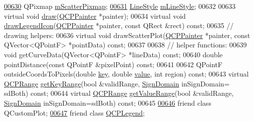 \begin{DoxyCode}
\hypertarget{a00116_source_l00630}{}\hyperlink{a00028_a04103a65b13b2218265e74c567a7061e}{00630}   QPixmap \hyperlink{a00028_a04103a65b13b2218265e74c567a7061e}{mScatterPixmap};
\hypertarget{a00116_source_l00631}{}\hyperlink{a00028_ae1f35ae2b15aee8e15bcdfec5be95156}{00631}   \hyperlink{a00028_a2710e9f79302152cff794c6e16cc01f1}{LineStyle} \hyperlink{a00028_ae1f35ae2b15aee8e15bcdfec5be95156}{mLineStyle};
00632   
00633   \textcolor{keyword}{virtual} \textcolor{keywordtype}{void} \hyperlink{a00024_aae10c24c7ed9d9364f0a5a4d9a5e5aec}{draw}(\hyperlink{a00047}{QCPPainter} *painter);
00634   \textcolor{keyword}{virtual} \textcolor{keywordtype}{void} \hyperlink{a00024_ab28af4bd3965813be4223d8092aed38b}{drawLegendIcon}(\hyperlink{a00047}{QCPPainter} *painter, \textcolor{keyword}{const} QRect &rect) \textcolor{keyword}{const};
00635   \textcolor{comment}{// drawing helpers:}
00636   \textcolor{keyword}{virtual} \textcolor{keywordtype}{void} drawScatterPlot(\hyperlink{a00047}{QCPPainter} *painter, \textcolor{keyword}{const} QVector<QPointF> *pointData) \textcolor{keyword}{const};
00637   
00638   \textcolor{comment}{// helper functions:}
00639   \textcolor{keywordtype}{void} getCurveData(QVector<QPointF> *lineData) \textcolor{keyword}{const};
00640   \textcolor{keywordtype}{double} pointDistance(\textcolor{keyword}{const} QPointF &pixelPoint) \textcolor{keyword}{const};
00641 
00642   QPointF outsideCoordsToPixels(\textcolor{keywordtype}{double} \hyperlink{a00116_a94bb892c30911cd62cba0707a5395be4}{key}, \textcolor{keywordtype}{double} \hyperlink{a00116_aee90379adb0307effb138f4871edbc5c}{value}, \textcolor{keywordtype}{int} region) \textcolor{keyword}{const};
00643   \textcolor{keyword}{virtual} \hyperlink{a00049}{QCPRange} \hyperlink{a00024_a7aa24ed0b3c39bd99338c7b9f145a71b}{getKeyRange}(\textcolor{keywordtype}{bool} &validRange, \hyperlink{a00024_a661743478a1d3c09d28ec2711d7653d8}{SignDomain} inSignDomain=
      sdBoth) \textcolor{keyword}{const};
00644   \textcolor{keyword}{virtual} \hyperlink{a00049}{QCPRange} \hyperlink{a00024_aed35cfebe5546feea7af2638dd869d5f}{getValueRange}(\textcolor{keywordtype}{bool} &validRange, 
      \hyperlink{a00024_a661743478a1d3c09d28ec2711d7653d8}{SignDomain} inSignDomain=sdBoth) \textcolor{keyword}{const};
00645   
\hypertarget{a00116_source_l00646}{}\hyperlink{a00028_a1cdf9df76adcfae45261690aa0ca2198}{00646}   \textcolor{keyword}{friend} \textcolor{keyword}{class }QCustomPlot;
\hypertarget{a00116_source_l00647}{}\hyperlink{a00028_a8429035e7adfbd7f05805a6530ad5e3b}{00647}   \textcolor{keyword}{friend} \textcolor{keyword}{class }\hyperlink{a00045}{QCPLegend};

\end{DoxyCode}
